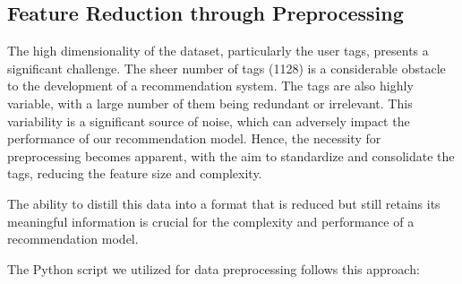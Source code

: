 


\subsection{Feature Reduction through Preprocessing}

The high dimensionality of the dataset, particularly the user tags, presents a significant challenge. The sheer number of tags (1128) is a considerable obstacle to the development of a recommendation system. The tags are also highly variable, with a large number of them being redundant or irrelevant. This variability is a significant source of noise, which can adversely impact the performance of our recommendation model. Hence, the necessity for preprocessing becomes apparent, with the aim to standardize and consolidate the tags, reducing the feature size and complexity.

The ability to distill this data into a format that is reduced but still retains its meaningful information is crucial for the complexity and performance of a recommendation model.

\noindent The Python script we utilized for data preprocessing follows this approach:

